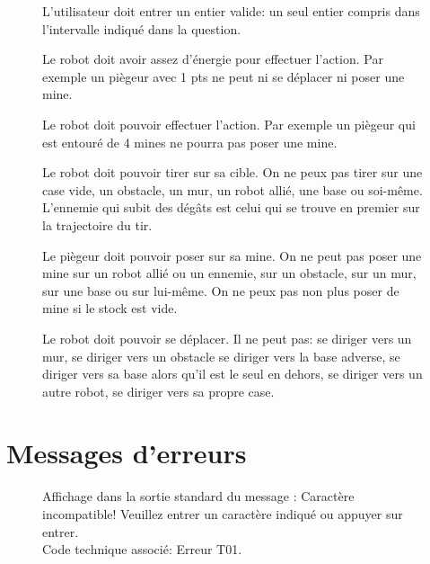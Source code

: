 \documentclass[12pt,a4paper]{article}
\begin{document}
\begin{itemize}
		\begin{figure}[H]
			\caption{
			  	\label{R2} %
			  	L'utilisateur doit entrer un entier valide: un seul entier compris dans l'intervalle indiqué dans la question.
			}
		\end{figure}

		\begin{figure}[H]
		   \caption{
		    	\label{R3} %
		    	Le robot doit avoir assez d'énergie pour effectuer l'action. Par exemple un piègeur avec 1 pts ne peut ni se déplacer ni poser une mine.
		    }
		\end{figure}

		\begin{figure}[H]
		   \caption{
		    	\label{R4} %
		    	Le robot doit pouvoir effectuer l'action. Par exemple un piègeur qui est entouré de 4 mines ne pourra pas poser une mine.
		    }
		\end{figure}

		\begin{figure}[H]
		   \caption{
		    	\label{R5} %
		    	Le robot doit pouvoir tirer sur sa cible. On ne peux pas tirer sur une case vide, un obstacle, un mur, un robot allié, une base ou soi-même. L'ennemie qui subit des dégâts est celui qui se trouve en premier sur la trajectoire du tir.
		    }
		\end{figure}

		\begin{figure}[H]
		   \caption{
		    	\label{R6} %
		    	Le piègeur doit pouvoir poser sur sa mine. On ne peut pas poser une mine sur un robot allié ou un ennemie, sur un obstacle, sur un mur, sur une base ou sur lui-même. On ne peux pas non plus poser de mine si le stock est vide.
		    }
		\end{figure}

		\begin{figure}[H]
		   \caption{
		    	\label{R7} %
		    	Le robot doit pouvoir se déplacer. Il ne peut pas: se diriger vers un mur, se diriger vers un obstacle se diriger vers la base adverse, se diriger vers sa base alors qu'il est le seul en dehors, se diriger vers un autre robot, se diriger vers sa propre case.
		    }
		\end{figure}

	\section{Messages d'erreurs}
	\begin{figure}[H]
		   \caption{
		    	\label{E1} %
		    	Affichage dans la sortie standard du message : Caractère incompatible! Veuillez entrer un caractère indiqué ou appuyer sur entrer. \\
		    	Code technique associé: Erreur T01.
			   }
		\end{figure}


\end{itemize}
\end{document}
